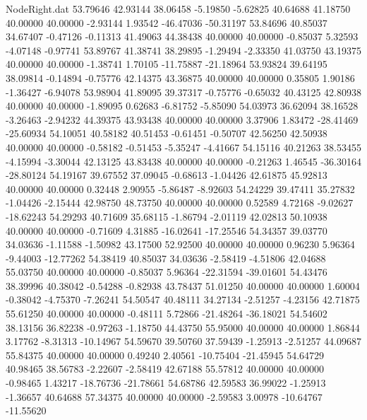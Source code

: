 \begin{filecontents}{NodeRight.dat}
  53.79646   42.93144   38.06458    -5.19850   -5.62825   40.64688   41.18750   40.00000   40.00000   -2.93144    1.93542  -46.47036  -50.31197
  53.84696   40.85037   34.67407    -0.47126   -0.11313   41.49063   44.38438   40.00000   40.00000   -0.85037    5.32593   -4.07148   -0.97741
  53.89767   41.38741   38.29895    -1.29494   -2.33350   41.03750   43.19375   40.00000   40.00000   -1.38741    1.70105  -11.75887  -21.18964
  53.93824   39.64195   38.09814    -0.14894   -0.75776   42.14375   43.36875   40.00000   40.00000    0.35805    1.90186   -1.36427   -6.94078
  53.98904   41.89095   39.37317    -0.75776   -0.65032   40.43125   42.80938   40.00000   40.00000   -1.89095    0.62683   -6.81752   -5.85090
  54.03973   36.62094   38.16528    -3.26463   -2.94232   44.39375   43.93438   40.00000   40.00000    3.37906    1.83472  -28.41469  -25.60934
  54.10051   40.58182   40.51453    -0.61451   -0.50707   42.56250   42.50938   40.00000   40.00000   -0.58182   -0.51453   -5.35247   -4.41667
  54.15116   40.21263   38.53455    -4.15994   -3.30044   42.13125   43.83438   40.00000   40.00000   -0.21263    1.46545  -36.30164  -28.80124
  54.19167   39.67552   37.09045    -0.68613   -1.04426   42.61875   45.92813   40.00000   40.00000    0.32448    2.90955   -5.86487   -8.92603
  54.24229   39.47411   35.27832    -1.04426   -2.15444   42.98750   48.73750   40.00000   40.00000    0.52589    4.72168   -9.02627  -18.62243
  54.29293   40.71609   35.68115    -1.86794   -2.01119   42.02813   50.10938   40.00000   40.00000   -0.71609    4.31885  -16.02641  -17.25546
  54.34357   39.03770   34.03636    -1.11588   -1.50982   43.17500   52.92500   40.00000   40.00000    0.96230    5.96364   -9.44003  -12.77262
  54.38419   40.85037   34.03636    -2.58419   -4.51806   42.04688   55.03750   40.00000   40.00000   -0.85037    5.96364  -22.31594  -39.01601
  54.43476   38.39996   40.38042    -0.54288   -0.82938   43.78437   51.01250   40.00000   40.00000    1.60004   -0.38042   -4.75370   -7.26241
  54.50547   40.48111   34.27134    -2.51257   -4.23156   42.71875   55.61250   40.00000   40.00000   -0.48111    5.72866  -21.48264  -36.18021
  54.54602   38.13156   36.82238    -0.97263   -1.18750   44.43750   55.95000   40.00000   40.00000    1.86844    3.17762   -8.31313  -10.14967
  54.59670   39.50760   37.59439    -1.25913   -2.51257   44.09687   55.84375   40.00000   40.00000    0.49240    2.40561  -10.75404  -21.45945
  54.64729   40.98465   38.56783    -2.22607   -2.58419   42.67188   55.57812   40.00000   40.00000   -0.98465    1.43217  -18.76736  -21.78661
  54.68786   42.59583   36.99022    -1.25913   -1.36657   40.64688   57.34375   40.00000   40.00000   -2.59583    3.00978  -10.64767  -11.55620

\end{filecontents}

